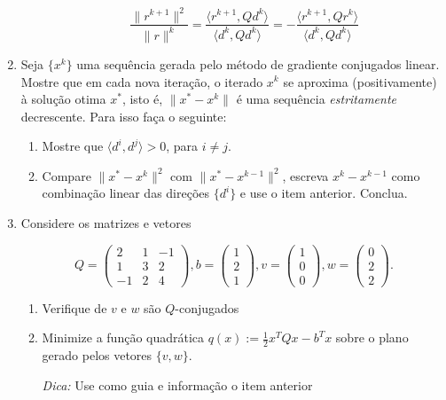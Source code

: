 \documentclass[a4paper,latin]{article}
\begin{document}
\begin{enumerate}
\begin{enumerate}
$$    	\frac{\|r^{k+1}\|^{2}}{\|r\|^{k}}=
    	\frac{\langle r^{k+1},Qd^{k}\rangle}{\langle d^{k}, Qd^{k}\rangle}=
    	-\frac{\langle r^{k+1},Qr^{k}\rangle}{\langle d^{k}, Qd^{k}\rangle}$$
    \end{enumerate}  
       \item Seja $\{x^{k}\}$ uma sequência gerada pelo método de gradiente conjugados linear. Mostre que em cada nova iteração, o 
    iterado $x^{k}$ se aproxima (positivamente) à solução otima $x^{*}$, isto é, 
    $\|x^*-x^{k}\|$ é uma sequência {\it estritamente} decrescente.
    Para isso faça o seguinte:
    \begin{enumerate}
    	\item Mostre que $\langle d^{i}, d^{j}\rangle>0$, para 
    	$i \neq j$. 
    	\item Compare $\|x^*-x^{k}\|^{2}$ com $\|x^*-x^{k-1}\|^{2}$, 
    	escreva $x^{k}-x^{k-1}$ como combinação linear das direções $\{d^{i}\}$ e use o item anterior.  Conclua.   	
    \end{enumerate}	  
    \item Considere os matrizes e vetores 
    
    $$
    Q=\begin{pmatrix}
    2 & 1 & -1 \\
    1 & 3 &  2 \\
    -1 & 2 & 4
    \end{pmatrix},  
    b=\begin{pmatrix}
    1 \\
    2 \\
    1
    \end{pmatrix}, 
    v=\begin{pmatrix}
    1 \\
    0 \\
    0
    \end{pmatrix}, 
    w=\begin{pmatrix}
    0 \\
    2 \\
    2
    \end{pmatrix}.$$
    \begin{enumerate}
    	\item Verifique de $v$ e $w$ são $Q$-conjugados
    	\item Minimize a função quadrática 
    	$q(x):=\frac{1}{2} x^{T}Qx-b^{T}x$ sobre o plano gerado pelos vetores $\{v,w\}$.
    	
    	{\it Dica: } Use como guia e informação o item anterior
    \end{enumerate}
    

\end{enumerate}
\end{document}
